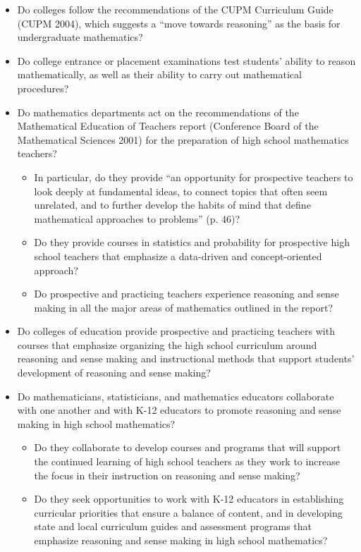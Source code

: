 \documentclass[
  10pt,
  a4paper,
  landscape,
  twoside,
  openany
]{scrbook}
\newcommand{\EN}[1]{#1}
\begin{document}
\TriPara
{
\EN{
  \begin{itemize}
    \item Do colleges follow the recommendations of the CUPM Curriculum Guide (CUPM 2004), which suggests a ``move towards reasoning'' as the basis for undergraduate mathematics?
    \item Do college entrance or placement examinations test students' ability to reason mathematically, as well as their ability to carry out mathematical procedures?
    \item Do mathematics departments act on the recommendations of the Mathematical Education of Teachers report (Conference Board of the Mathematical Sciences 2001) for the preparation of high school mathematics teachers?
      \begin{itemize}
        \item In particular, do they provide ``an opportunity for prospective teachers to look deeply at fundamental ideas, to connect topics that often seem unrelated, and to further develop the habits of mind that define mathematical approaches to problems'' (p. 46)?
        \item Do they provide courses in statistics and probability for prospective high school teachers that emphasize a data-driven and concept-oriented approach?
        \item Do prospective and practicing teachers experience reasoning and sense making in all the major areas of mathematics outlined in the report?
      \end{itemize}
    \item Do colleges of education provide prospective and practicing teachers with courses that emphasize organizing the high school curriculum around reasoning and sense making and instructional methods that support students' development of reasoning and sense making?
    \item Do mathematicians, statisticians, and mathematics educators collaborate with one another and with K-12 educators to promote reasoning and sense making in high school mathematics?
      \begin{itemize}
        \item Do they collaborate to develop courses and programs that will support the continued learning of high school teachers as they work to increase the focus in their instruction on reasoning and sense making?
        \item Do they seek opportunities to work with K-12 educators in establishing curricular priorities that ensure a balance of content, and in developing state and local curriculum guides and assessment programs that emphasize reasoning and sense making in high school mathematics?
      \end{itemize}
  \end{itemize}}
}
\end{document}
